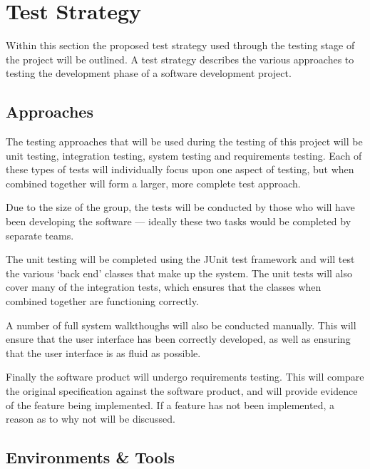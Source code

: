 \section{Test Strategy}
\label{sec:test_strategy}

Within this section the proposed test strategy used through the testing stage of 
the project will be outlined. A test strategy describes the various approaches 
to testing the development phase of a software development project. 


\subsection{Approaches}
\label{sub:approaches}

The testing approaches that will be used during the testing of this project will
be unit testing, integration testing, system testing and requirements testing. 
Each of these types of tests will individually focus upon one aspect of testing,
but when combined together will form a larger, more complete test approach.

Due to the size of the group, the tests will be conducted by those who will have
been developing the software --- ideally these two tasks would be completed by 
separate teams.

The unit testing will be completed using the JUnit test framework and will test
the various `back end' classes that make up the system. The unit tests will also
cover many of the integration tests, which ensures that the classes when 
combined together are functioning correctly. 

A number of full system walkthoughs will also be conducted manually. This will 
ensure that the user interface has been correctly developed, as well as ensuring
that the user interface is as fluid as possible. 

Finally the software product will undergo requirements testing. This will 
compare the original specification against the software product, and will 
provide evidence of the feature being implemented. If a feature has not been 
implemented, a reason as to why not will be discussed.


\subsection{Environments \& Tools}
\label{sub:environments_and_tools}

